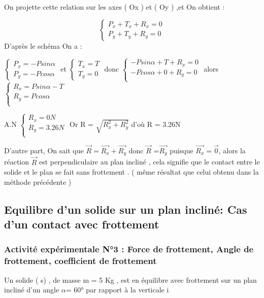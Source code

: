\documentclass[12pt]{article}
\begin{document}
On projette cette relation sur les axes ( Ox ) et ( Oy ) ,et On obtient :

$$\begin{cases}
  P_x + T_x + R_x = 0\\
  P_y + T_y + R_y = 0
\end{cases}
$$
D’après le schéma On a : 

$\begin{cases}
  P_x = -Psin\alpha\\
  P_y = -Pcos\alpha
\end{cases}
$ et 
$\begin{cases}
  T_x = T\\
  T_y = 0
\end{cases}
$ donc 
$\begin{cases}
  -Psin\alpha + T + R_x = 0\\
  -Pcos\alpha + 0 + R_y = 0\\
\end{cases}
$
alors 
$\begin{cases}
  R_x = Psin\alpha - T \\
  R_y = Pcos\alpha\\
\end{cases}
$

A.N
$
\begin{cases}
  R_x = 0 N \\
  R_y = 3.26N\\
\end{cases}
$
Or R = $\sqrt{R_x^2 + R_y^2}$ d’où R = 3.26N

D’autre part, On sait que $\vec{R} = \vec{R_x}  + \vec{R_y}$ donc $\vec{R}$ =$\vec{R_y}$ puisque $\vec{R_x} = \vec{0}$, alors la réaction $\vec{R}$ est
perpendiculaire au plan incliné , cela signifie que le contact entre le solide et le plan se fait sans
frottement . ( même résultat que celui obtenu dans la méthode précédente )

\subsection{Equilibre d’un solide sur un plan incliné: Cas d’un contact avec frottement }
\subsubsection{Activité expérimentale N°3 : Force de frottement, Angle de frottement, coefficient de frottement  }
Un solide ( s) , de masse m = 5 Kg , est en équilibre avec frottement sur un plan incliné d’un angle $\alpha $= 60°
par rapport à la verticale i
\end{document}
